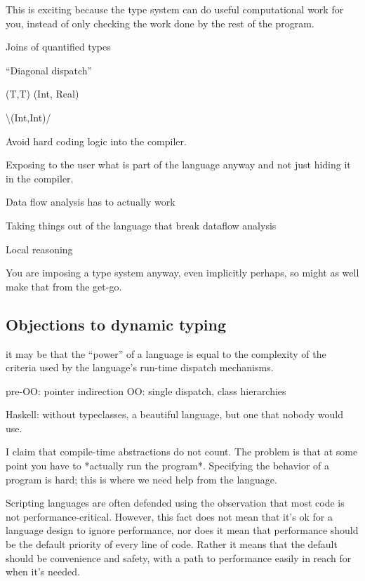 This is exciting because the type system can do useful computational work for you,
instead of only checking the work done by the rest of the program.

Joins of quantified types

``Diagonal dispatch''

(T,T) (Int, Real)

\textbackslash{}(Int,Int)/

Avoid hard coding logic into the compiler.


Exposing to the user what is part of the language anyway and not just
hiding it in the compiler.

Data flow analysis has to actually work

Taking things out of the language that break dataflow analysis

Local reasoning

You are imposing a type system anyway, even implicitly perhaps, so
might as well make that from the get-go.


\subsection{Objections to dynamic typing}


it may be that the ``power'' of a language is equal to the complexity
of the criteria used by the language's run-time dispatch mechanisms.

pre-OO: pointer indirection
OO: single dispatch, class hierarchies

Haskell: without typeclasses, a beautiful language, but one that nobody
would use.

I claim that compile-time abstractions do not count. The problem is that
at some point you have to *actually run the program*. Specifying the
behavior of a program is hard; this is where we need help from the
language.


Scripting languages are often defended using the observation that most
code is not performance-critical. However, this fact does not mean that
it's ok for a language design to ignore performance, nor does it mean
that performance should be the default priority of every line of code.
Rather it means that the default should be convenience and safety, with
a path to performance easily in reach for when it's needed.
